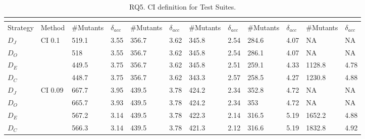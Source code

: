 

\begin{table*}[h]
\centering
\scriptsize
\caption{RQ5. CI definition for \APPR Test Suites.}
\label{table:results:ciDefinition} 
\begin{tabular}{|l|l|llllllllll|}
\hline
          &                           & \multicolumn{2}{c}{\GCSP{}} & \multicolumn{2}{c}{\PARAM{}} & \multicolumn{2}{c}{\UTIL{}} & \multicolumn{2}{c}{\MLFS{}{}} & \multicolumn{2}{c|}{\SAIL{}} \\
\hline
Strategy  & Method                    & \#Mutants    & \textbf{$\delta_{acc}$}    & \#Mutants    & \textbf{$\delta_{acc}$}    & \#Mutants    & \textbf{$\delta_{acc}$}   & \#Mutants  & \textbf{$\delta_{acc}$}  & \#Mutants   & \textbf{$\delta_{acc}$}  \\
\hline
$D_J$   & \multirow{4}{*}{CI 0.1}  & 519.1        & 3.55          & 356.7        & 3.62          & 345.8        & 2.54         & 284.6      & 4.07        &    NA         &     NA        \\
$D_O$    &                           				& 518        & 3.55          & 356.7        & 3.62          & 345.8        & 2.54         & 286.1      & 4.07        &       NA     &     NA        \\
$D_E$ &                           					& 449.5        & 3.75          & 356.7        & 3.62          & 345.8        & 2.51         & 259.1      & 4.33        &   1128.8          & 4.78            \\
$D_C$    &                          					 & 448.7        & 3.75          & 356.7        & 3.62          & 343.3        & 2.57         & 258.5      & 4.27        &    1230.8 &   4.88          \\
\hline
$D_J$   & \multirow{4}{*}{CI 0.09} & 667.7        & 3.95          & 439.5        & 3.78          & 424.2        & 2.34         & 352.8      & 4.72        &     NA        &    NA         \\
$D_O$    &                          					 & 665.7        & 3.93          & 439.5        & 3.78          & 424.2        & 2.34         & 353      & 4.72        &        NA     &       NA      \\
$D_E$ &                           					& 567.2        & 3.14          & 439.5        & 3.78          & 422.3         & 2.14         & 316.5      & 5.19        &  1652.2           & 4.88            \\
$D_C$    &                          					 & 566.3        & 3.14          & 439.5        & 3.78          & 421.3        & 2.12         & 316.6      & 5.19        &   1832.8          &  4.92           \\

\end{tabular}
\end{table*}
